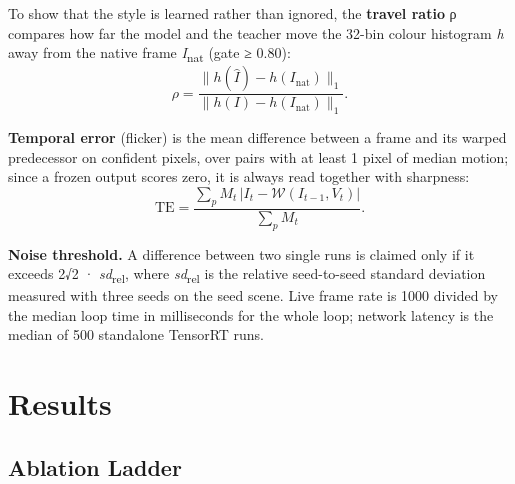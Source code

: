 \documentclass[conference]{IEEEtran}
\begin{document}
To show that the style is learned rather than ignored, the \textbf{travel ratio} ρ compares how far the model and the teacher move the 32-bin colour histogram \textit{h} away from the native frame \textit{I}\textsubscript{nat} (gate ≥ 0.80):
\begin{equation}\label{eq:travel}
\rho = \frac{\lVert h(\hat I) - h(I_{\mathrm{nat}}) \rVert_1}{\lVert h(I) - h(I_{\mathrm{nat}}) \rVert_1}.
\end{equation}

\textbf{Temporal error} (flicker) is the mean difference between a frame and its warped predecessor on confident pixels, over pairs with at least 1 pixel of median motion; since a frozen output scores zero, it is always read together with sharpness:
\begin{equation}\label{eq:te}
\mathrm{TE} = \frac{\sum_p M_t\, |I_t - \mathcal{W}(I_{t-1}, V_t)|}{\sum_p M_t}.
\end{equation}

\textbf{Noise threshold.} A difference between two single runs is claimed only if it exceeds 2√2 · \textit{sd}\textsubscript{rel}, where \textit{sd}\textsubscript{rel} is the relative seed-to-seed standard deviation measured with three seeds on the seed scene. Live frame rate is 1000 divided by the median loop time in milliseconds for the whole loop; network latency is the median of 500 standalone TensorRT runs.

\section{Results}\label{sec:results}

\subsection{Ablation Ladder}
\end{document}
